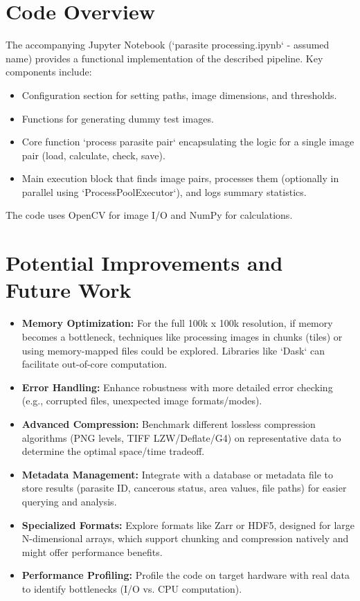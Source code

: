 \documentclass{article}
\begin{document}
\section{Code Overview}
The accompanying Jupyter Notebook (`parasite processing.ipynb` - assumed name) provides a functional implementation of the described pipeline. Key components include:
\begin{itemize}
    \item Configuration section for setting paths, image dimensions, and thresholds.
    \item Functions for generating dummy test images.
    \item Core function `process parasite pair` encapsulating the logic for a single image pair (load, calculate, check, save).
    \item Main execution block that finds image pairs, processes them (optionally in parallel using `ProcessPoolExecutor`), and logs summary statistics.
\end{itemize}
The code uses OpenCV for image I/O and NumPy for calculations.

\section{Potential Improvements and Future Work}
\begin{itemize}
    \item \textbf{Memory Optimization:} For the full 100k x 100k resolution, if memory becomes a bottleneck, techniques like processing images in chunks (tiles) or using memory-mapped files could be explored. Libraries like `Dask` can facilitate out-of-core computation.
    \item \textbf{Error Handling:} Enhance robustness with more detailed error checking (e.g., corrupted files, unexpected image formats/modes).
    \item \textbf{Advanced Compression:} Benchmark different lossless compression algorithms (PNG levels, TIFF LZW/Deflate/G4) on representative data to determine the optimal space/time tradeoff.
    \item \textbf{Metadata Management:} Integrate with a database or metadata file to store results (parasite ID, cancerous status, area values, file paths) for easier querying and analysis.
    \item \textbf{Specialized Formats:} Explore formats like Zarr or HDF5, designed for large N-dimensional arrays, which support chunking and compression natively and might offer performance benefits.
    \item \textbf{Performance Profiling:} Profile the code on target hardware with real data to identify bottlenecks (I/O vs. CPU computation).
\end{itemize}
\end{document}
